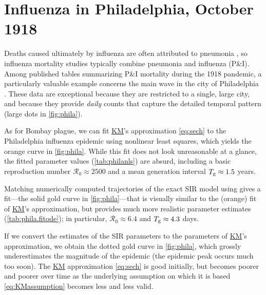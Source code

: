 \documentclass[]{interact}\usepackage[]{graphicx}\usepackage[]{xcolor}
\theoremstyle{plain}%
\theoremstyle{definition}
\theoremstyle{remark}
\newcommand{\R}{{\mathcal R}}
\newcommand{\Rn}{\R_0}
\newcommand{\Tg}{T_{\rm g}}
\newcommand{\KM}{\protect\hyperlink{cite.KermMcKe27}{KM}\xspace}
\newcommand{\code}[1]{\texttt{\detokenize{#1}}}
\newcommand{\nlscol}{orange\xspace}  %
\newcommand{\FOnbcol}{gold\xspace}
\begin{document}
\section{Influenza in Philadelphia, October 1918}\label{sec:phila}

Deaths caused ultimately by influenza are often attributed to
pneumonia \citep{Earn+02}, so influenza mortality studies typically
combine pneumonia and influenza (P\&I).  Among published tables
summarizing P\&I mortality during the 1918 pandemic, a particularly
valuable example concerns the main wave in the city of Philadelphia
\citep{Roge20}.  These data are exceptional because they are
restricted to a single, large city, and because they provide
\emph{daily} counts that capture the detailed temporal pattern (large
dots in \cref{fig:phila}).



















As for Bombay plague, we can fit \KM's approximation \eqref{eq:sech}
to the Philadelphia influenza epidemic using nonlinear least squares,
which yields the \nlscol curve in \cref{fig:phila}.  While this \code{nls}
fit does not look unreasonable at a glance, the fitted parameter
values (\cref{tab:philanls}) are absurd, including a basic
reproduction number $\Rn\approx 2500$ and a
mean generation interval $\Tg\approx 1.5$
years.

Matching numerically computed trajectories of the exact SIR model
using \code{fitode} gives a fit---the solid \FOnbcol curve in
\cref{fig:phila}---that is visually similar to the (\nlscol) fit of
\KM's approximation, but provides much more realistic parameter
estimates (\cref{tab:phila.fitode}); in particular,
$\Rn\approx 6.4$ and
$\Tg\approx 4.3$ days.

If we convert the \code{fitode} estimates of the SIR parameters to the
parameters of \KM's approximation, we obtain the dotted \FOnbcol curve
in \cref{fig:phila}, which grossly underestimates the magnitude of the
epidemic (the epidemic peak occurs much too soon).  The \KM
approximation \eqref{eq:sech} is good initially, but becomes poorer
and poorer over time as the underlying assumption on which it is based
\eqref{eq:KMassumption} becomes less and less valid.
\end{document}
